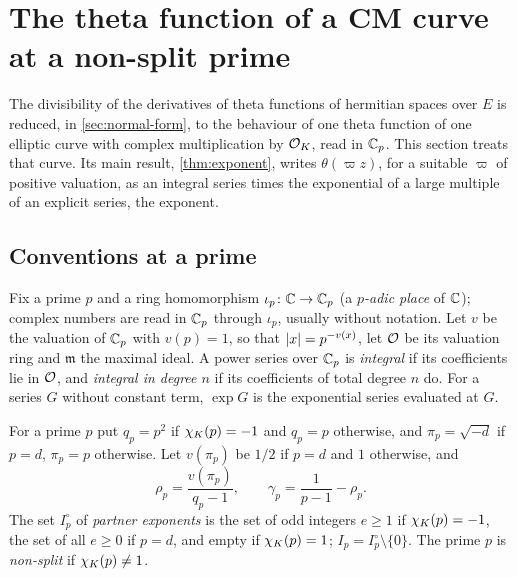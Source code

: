\section{The theta function of a CM curve at a non-split prime}\label{sec:one-curve}

The divisibility of the derivatives of theta functions of hermitian spaces over $E$ is reduced, in
\cref{sec:normal-form}, to the behaviour of one theta function of one elliptic curve with complex
multiplication by $\mathcal{O}_K$, read in $\mathbb{C}_p$. This section treats that curve. Its main result,
\cref{thm:exponent}, writes $\theta(\varpi z)$, for a suitable $\varpi$ of positive valuation, as an
integral series times the exponential of a large multiple of an explicit series, the exponent.

\subsection{Conventions at a prime}\label{ss:conventions-prime}
Fix a prime $p$ and a ring homomorphism $\iota_p\colon\mathbb{C}\to\mathbb{C}_p$ (a \emph{$p$-adic place} of $\mathbb{C}$);
complex numbers are read in $\mathbb{C}_p$ through $\iota_p$, usually without notation. Let $v$ be the
valuation of $\mathbb{C}_p$ with $v(p)=1$, so that $\lvert x\rvert=p^{-v(x)}$, let $\mathcal{O}$ be its valuation ring and
$\mathfrak m$ the maximal ideal. A power series over $\mathbb{C}_p$ is \emph{integral} if its coefficients lie
in $\mathcal{O}$, and \emph{integral in degree $n$} if its coefficients of total degree $n$ do. For a series
$G$ without constant term, $\exp G$ is the exponential series evaluated at $G$.

\begin{definition}\label{def:prime-notation}
For a prime $p$ put $q_p=p^2$ if $\chi_K(p)=-1$ and $q_p=p$ otherwise, and $\pi_p=\sqrt{-d}$ if $p=d$,
$\pi_p=p$ otherwise. Let $v(\pi_p)$ be $1/2$ if $p=d$ and $1$ otherwise, and
\[
  \rho_p=\frac{v(\pi_p)}{q_p-1},\qquad \gamma_p=\frac1{p-1}-\rho_p .
\]
The set $I_p^\circ$ of \emph{partner exponents} is the set of odd integers $e\ge1$ if $\chi_K(p)=-1$,
the set of all $e\ge0$ if $p=d$, and empty if $\chi_K(p)=1$; $I_p=I_p^\circ\setminus\{0\}$. The prime
$p$ is \emph{non-split} if $\chi_K(p)\ne1$.
\end{definition}

